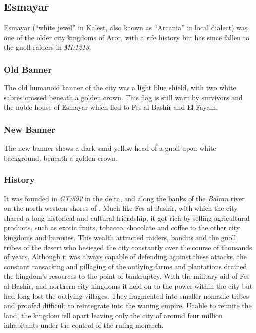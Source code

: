 \subsection{Esmayar}
\label{sec:Esmayar}

Esmayar (``white jewel'' in Kalest, also known as ``Arcania'' in local
dialect) was one of the older city kingdoms of Aror, with a rife history but
has since fallen to the gnoll raiders in \emph{MI:1213}.

\subsubsection{Old Banner}

The old humanoid banner of the city was a light blue shield, with two white
sabres crossed beneath a golden crown. This flag is still warn by survivors and
the noble house of Esmayar which fled to Fes al-Bashir and El-Fayam.

\subsubsection{New Banner}

The new banner shows a dark sand-yellow head of a gnoll upon white background,
beneath a golden crown.

\subsubsection{History}

It was founded in \emph{GT:592} in the delta, and along the banks of the
\emph{Balran} river on the north western shores of . Much
like Fes al-Bashir, with which the city shared a long historical and cultural
friendship, it got rich by selling agricultural products, such as exotic
fruits, tobacco, chocolate and coffee to the other city kingdoms and
baronies. This wealth attracted raiders, bandits and the gnoll tribes of the
desert who besieged the city constantly over the course of thousands of
years. Although it was always capable of defending against these attacks, the
constant ransacking and pillaging of the outlying farms and plantations
drained the kingdom's resources to the point of bankruptcy. With the military
aid of Fes al-Bashir, and northern city kingdoms it held on to the power within
the city but had long lost the outlying villages. They fragmented into smaller
nomadic tribes and proofed difficult to reintegrate into the waning
empire. Unable to reunite the land, the kingdom fell apart leaving only the
city of around four million inhabitants under the control of the ruling
monarch.

